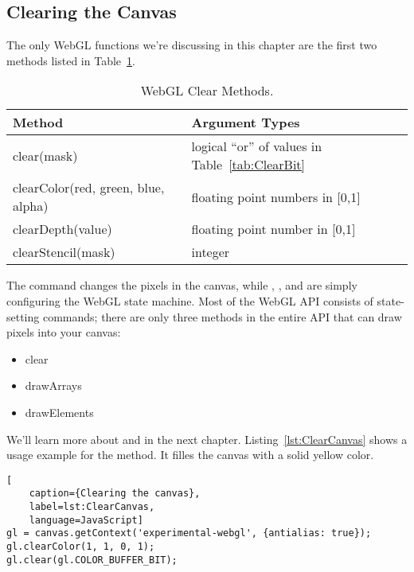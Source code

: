 
\subsection{Clearing the Canvas}

The only WebGL functions we're discussing in this chapter are the first two methods listed in Table~\ref{tab:Clearing}.

\begin{table}[htb]\centering
  \begin{tabular}{ll}
    \hline
    Method & Argument Types \\
    \hline
    clear(mask) & logical ``or'' of values in Table~\ref{tab:ClearBit} \\
    clearColor(red, green, blue, alpha)  & floating point numbers in [0,1] \\
    clearDepth(value) & floating point number in [0,1] \\
    clearStencil(mask) & integer \\
    \hline
  \end{tabular}
  \caption{WebGL Clear Methods.}
  \label{tab:Clearing}
\end{table}

The  command changes the pixels in the canvas, while , , and  are simply configuring the WebGL state machine.  Most of the WebGL API consists of state-setting commands; there are only three methods in the entire API that can draw pixels into your canvas:

\begin{itemize}
\item clear
\item drawArrays
\item drawElements
\end{itemize}

We'll learn more about  and  in the next chapter.  Listing~\ref{lst:ClearCanvas} shows a usage example for the  method.  It filles the canvas with a solid yellow color.

\begin{lstlisting}[
    caption={Clearing the canvas},
    label=lst:ClearCanvas,
    language=JavaScript]
gl = canvas.getContext('experimental-webgl', {antialias: true});
gl.clearColor(1, 1, 0, 1);
gl.clear(gl.COLOR_BUFFER_BIT);
\end{lstlisting}

